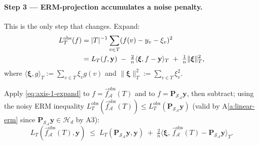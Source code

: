 \documentclass[11pt,a4paper]{article}
\theoremstyle{plain}
\theoremstyle{definition}
\theoremstyle{remark}
\newcommand{\by}{\mathbf{y}}
\newcommand{\bxi}{\boldsymbol{\xi}}
\newcommand{\bP}{\mathbf{P}}
\newcommand{\Scal}{\mathcal{S}}
\newcommand{\Acal}{\mathcal{A}}
\newcommand{\Hcal}{\mathcal{H}}
\begin{document}
\paragraph{Step 3 --- ERM-projection accumulates a noise penalty.}
This is the only step that changes. Expand:
\begin{align}
    L_T^{\mathrm{obs}}(f)
    &= |T|^{-1}\sum_{v \in T}(f(v) - y_v - \xi_v)^2 \notag\\
    &= L_T(f, \by) \;-\; \tfrac{2}{n}\langle \bxi, f - \by\rangle_T
        \;+\; \tfrac{1}{n}\|\bxi\|_T^2,
    \label{eq:axis-1-expand}
\end{align}
where $\langle \bxi, g\rangle_T := \sum_{v \in T} \xi_v g(v)$ and
$\|\bxi\|_T^2 := \sum_{v \in T} \xi_v^2$.

Apply \eqref{eq:axis-1-expand} to $f = \hat f^{\mathrm{obs}}_\Acal(T)$
and to $f = \bP_{\Scal_\Acal}\by$, then subtract; using the noisy
ERM inequality
$L_T^{\mathrm{obs}}(\hat f^{\mathrm{obs}}_\Acal(T)) \le L_T^{\mathrm{obs}}(\bP_{\Scal_\Acal}\by)$
(valid by A\ref{a:linear-erm} since $\bP_{\Scal_\Acal}\by \in
\Hcal_d$ by A3):
\begin{equation}
    L_T(\hat f^{\mathrm{obs}}_\Acal(T), \by)
    \;\le\; L_T(\bP_{\Scal_\Acal}\by, \by)
        \;+\; \tfrac{2}{n}\big\langle \bxi,\, \hat f^{\mathrm{obs}}_\Acal(T) - \bP_{\Scal_\Acal}\by \big\rangle_T.
    \label{eq:axis-1-erm-noisy}
\end{equation}
\end{document}
